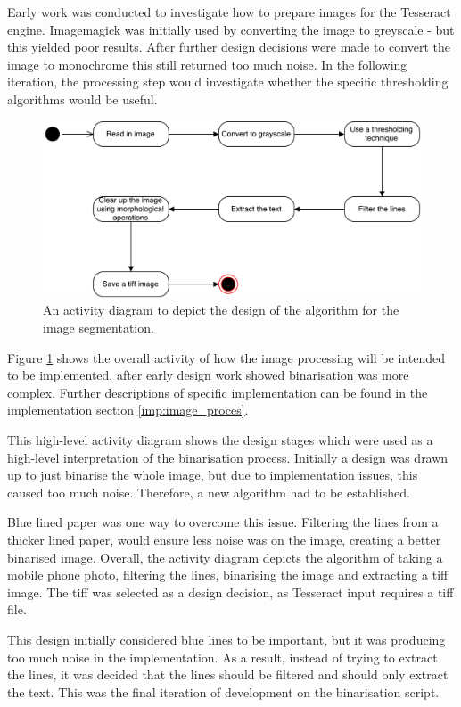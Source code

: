 Early work was conducted to investigate how to prepare images for the Tesseract engine. Imagemagick \cite{citeulike:14023816} was initially used by converting the image to greyscale - but this yielded poor results. After further design decisions were made to convert the image to monochrome this still returned too much noise. In the following iteration, the processing step would investigate whether the specific thresholding algorithms would be useful.
\begin{figure}[H]
  \centering
  \includegraphics[scale=0.5]{images/image_binarisation_activity.pdf}
  \caption{An activity diagram to depict the design of the algorithm for the image segmentation.}
  \label{fig:activity_binarise}
\end{figure}

Figure \ref{fig:activity_binarise} shows the overall activity of how the image processing will be intended to be implemented, after early design work showed binarisation was more complex. Further descriptions of specific implementation can be found in the implementation section \ref{imp:image_proces}.

This high-level activity diagram shows the design stages which were used as a  high-level interpretation of the binarisation process. Initially a design was drawn up to just binarise the whole image, but due to implementation issues, this caused too much noise. Therefore, a new algorithm had to be established.

Blue lined paper was one way to overcome this issue. Filtering the lines from a thicker lined paper, would ensure less noise was on the image, creating a better binarised image. Overall, the activity diagram depicts the algorithm of taking a mobile phone photo, filtering the lines, binarising the image and extracting a tiff image. The tiff was selected as a design decision, as Tesseract input requires a tiff file.

This design initially considered blue lines to be important, but it was producing too much noise in the implementation. As a result, instead of trying to extract the lines, it was decided that the lines should be filtered and should only extract the text. This was the final iteration of development on the binarisation script.

